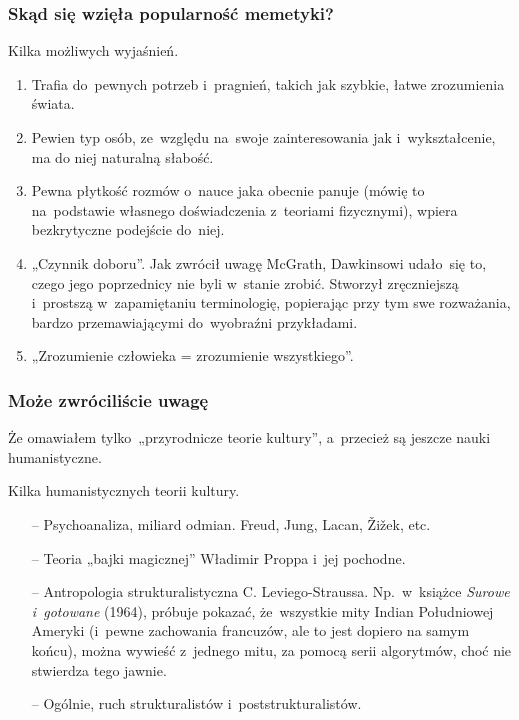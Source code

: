 \documentclass[10pt,t]{beamer}
\begin{document}
\begin{frame}
  \frametitle{Skąd się wzięła popularność memetyki?}


  Kilka możliwych wyjaśnień.
  \begin{enumerate}
  \item Trafia do~pewnych potrzeb i~pragnień, takich jak szybkie,
    łatwe zrozumienia świata.

  \item Pewien typ osób, ze~względu na~swoje zainteresowania jak
    i~wykształcenie, ma do niej naturalną słabość.

  \item Pewna płytkość rozmów o~nauce jaka obecnie panuje (mówię to
    na~podstawie własnego doświadczenia z~teoriami fizycznymi),
    wpiera bezkrytyczne podejście do~niej.

  \item„Czynnik doboru”. Jak zwrócił uwagę McGrath, Dawkinsowi
    udało~się to, czego jego poprzednicy nie byli w~stanie zrobić.
    Stworzył zręczniejszą i~prostszą w~zapamiętaniu terminologię,
    popierając przy tym swe rozważania, bardzo przemawiającymi
    do~wyobraźni przykładami.

  \item „Zrozumienie człowieka = zrozumienie wszystkiego”.

  \end{enumerate}

\end{frame}





\begin{frame}
  \frametitle{Może zwróciliście uwagę}

  Że omawiałem tylko~„przyrodnicze teorie kultury”, a~przecież są jeszcze
  nauki humanistyczne.


  Kilka humanistycznych teorii kultury.
  \begin{itemize}

  \item[--] Psychoanaliza, miliard odmian. Freud, Jung, Lacan,
    \v{Z}i\v{z}ek, etc.

  \item[--] Teoria „bajki magicznej” Władimir Proppa i~jej pochodne.

  \item[--] Antropologia strukturalistyczna C. Leviego-Straussa.
    Np.~w~książce \textit{Surowe i~gotowane} (1964), próbuje
    pokazać, że~wszystkie mity Indian Południowej Ameryki (i~pewne
    zachowania francuzów, ale to jest dopiero na samym końcu), można
    wywieść z~jednego mitu, za pomocą serii algorytmów, choć nie stwierdza
    tego jawnie.

  \item[--] Ogólnie, ruch strukturalistów i~poststrukturalistów.

  \end{itemize}

\end{frame}
\end{document}
